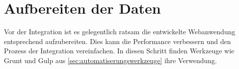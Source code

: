 \section{Aufbereiten der Daten}
\label{sec:aufbereiten}
Vor der Integration ist es gelegentlich ratsam die entwickelte Webanwendung entsprechend aufzubereiten. Dies kann die Performance verbessern und den Prozess der Integration vereinfachen. In diesen Schritt finden Werkzeuge wie Grunt und Gulp aus \autoref{sec:automatiserungswerkzeuge} ihre Verwendung.

